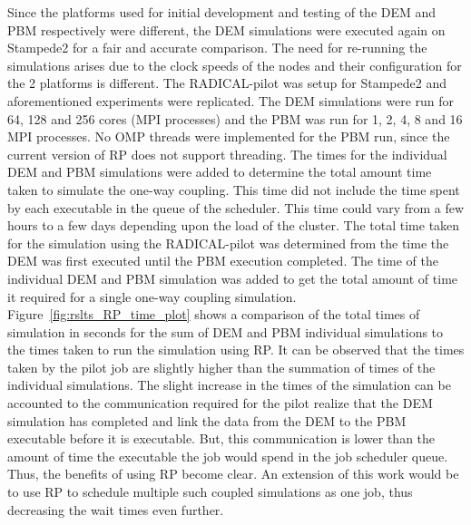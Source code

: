 \documentclass[preprint,11pt,authoryear]{elsarticle}
\begin{document}
Since the platforms used for initial development and testing of the DEM and PBM respectively were different, 
the DEM simulations were executed again on Stampede2 for a fair and accurate comparison. The need for re-running
the simulations arises due to the clock speeds of the nodes and their configuration for the 2 platforms is different.
The RADICAL-pilot was setup for Stampede2 and aforementioned experiments were replicated. The DEM simulations were 
run for 64, 128 and 256 cores (MPI processes) and the PBM was run for 1, 2, 4, 8 and 16 MPI processes. No OMP threads 
were implemented for the PBM run, since the current version of RP does not support threading. 
 The times for the individual DEM and PBM simulations were added to determine the total amount time taken to 
simulate the one-way coupling. This time did not include the time spent by each executable in the queue of the 
scheduler. This time could vary from a few hours to a few days depending upon the load of the cluster. The total 
time taken for the simulation using the RADICAL-pilot was determined from the time the DEM was first executed until 
the PBM execution completed. The time of the individual DEM and PBM simulation was added to get the total amount of 
time it required for a single one-way coupling simulation. Figure~\ref{fig:rslts_RP_time_plot} shows a comparison of 
the total times of simulation in seconds for the sum of DEM and PBM individual simulations to the times taken to 
run the simulation using RP. It can be observed that the times taken by the pilot job are slightly higher 
than the summation of times of the individual simulations. The slight increase in the times of the simulation 
can be accounted to the communication required for the pilot realize that the DEM simulation has completed 
and link the data from the DEM to the PBM executable before it is executable. But, this communication is 
lower than the amount of time the executable the job would spend in the job scheduler queue. 
Thus, the benefits of using RP become clear. An extension of this work would be to use RP to schedule 
multiple such coupled simulations as one job, thus decreasing the wait times even further. 
\end{document}
